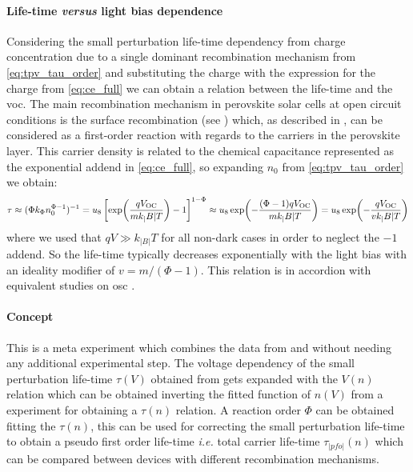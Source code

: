 	\paragraph{Life-time \textit{versus} light bias dependence}\label{tpv_tau_vs_intensity}
	Considering the small perturbation life-time dependency from charge concentration due to a single dominant recombination mechanism from \cref{eq:tpv_tau_order} and substituting the charge with the expression for the charge from \cref{eq:ce_full} we can obtain a relation between the life-time and the \gls{voc}.
	The main recombination mechanism in perovskite solar cells at open circuit conditions is the surface recombination (see ) which, as described in , can be considered as a first-order reaction with regards to the carriers \label{tpv_chemical_charge}in the perovskite layer.
	This carrier density is related to the chemical capacitance represented as the exponential addend in \cref{eq:ce_full}, so expanding $n_0$ from \cref{eq:tpv_tau_order} we obtain:
	\begin{dmath}\label{eq:tpv_tau_vs_intensity}
		\tau \approx (\Phi k_\Phi n_0^{\Phi-1})^{-1} = u_8\left[\exp(\frac{q\voc}{mk_|B|T}) - 1\right]^{1-\Phi} \approx u_8\exp(-\frac{(\Phi-1)q\voc}{mk_|B|T}) = u_8\exp(-\frac{q\voc}{vk_|B|T})
	\end{dmath}
	where we used that $qV \gg k_|B|T$ for all non-dark cases in order to neglect the $-1$ addend.
	So the life-time typically decreases exponentially with the light bias with an ideality modifier of $v = m/(\Phi-1)$.
	This relation is in accordion with equivalent studies on \gls{osc} \cite{Shuttle2008,Shuttle2008d,Credgington2011}.

\label{tpvce}

\paragraph{Concept}
This is a meta experiment which combines the data from  and  without needing any additional experimental step.
The voltage dependency of the small perturbation life-time $\tau(V)$ obtained from  gets expanded with the $V(n)$ relation which can be obtained inverting the fitted function of $n(V)$ from a  experiment for obtaining a $\tau(n)$ relation.
A reaction order $\Phi$ can be obtained fitting the $\tau(n)$, this can be used for correcting the small perturbation life-time to obtain a pseudo first order life-time \textit{i.e.} total carrier life-time $\tau_|pfo|(n)$ which can be compared between devices with different recombination mechanisms.

